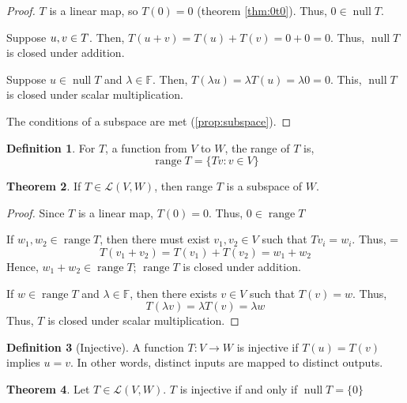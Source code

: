 \documentclass[12pt]{report}
\numberwithin{equation}{section}
\theoremstyle{definition}
\newtheorem{theorem}{Theorem}[section]
\newtheorem{definition}[theorem]{Definition}
\DeclareMathOperator{\nulll}{null}
\DeclareMathOperator{\range}{range}
\begin{document}
\begin{proof}
	$ T $ is a linear map, so $ T(0)=0 $ (theorem \ref{thm:0t0}). Thus, $ 0\in\nulll T $.
	
	Suppose $ u,v\in\null T $. Then, $ T(u+v) = T(u) + T(v) = 0 + 0 = 0 $. Thus, $ \nulll T$ is closed under addition. 
	
	Suppose $ u\in\nulll T $ and $  \lambda \in \mathbb{F}$. Then, $ T(\lambda u)  = \lambda T(u) = \lambda 0 = 0$. This, $ \nulll T $ is closed under scalar multiplication.
	
	The conditions of a subspace are met (\ref{prop:subspace}).
\end{proof}

\begin{definition} For $ T $, a function from $ V $ to $ W $, the range of $ T $ is,
	\begin{equation}
			\range T = \{Tv : v\in V\}
	\end{equation}
\end{definition}

\begin{theorem} If $ T\in\mathcal{L}(V,W) $, then range $ T $ is a subspace of $ W $.
\end{theorem}
\begin{proof}
	Since $ T $ is a linear map, $ T(0) = 0 $. Thus, $ 0\in\range T $
	
	If $ w_1, w_2\in \range T $, then there must exist $ v_1, v_2\in V $ such that $ Tv_i = w_i $. Thus, =
	\begin{equation}
			T(v_1+v_2) = T(v_1) + T(v_2) = w_1 + w_2
	\end{equation}
	Hence, $ w_1 + w_2 \in \range T $; $ \range T $ is closed under addition.
	
	If $ w\in\range T $ and $ \lambda\in \mathbb{F} $, then there exists $ v\in V $ such that $ T(v) = w $. Thus,
	\begin{equation}
			T(\lambda v) = \lambda T(v) = \lambda w
	\end{equation}
	Thus, $ T $ is closed under scalar multiplication.
\end{proof}

\begin{definition}[Injective]
	A function $ T: V\rightarrow W $ is injective if $ T(u) = T(v) $ implies $ u=v $. In other words, distinct inputs are mapped to distinct outputs.
\end{definition}

\begin{theorem}
	Let $ T\in \mathcal{L}(V, W) $. $ T $ is injective if and only if $ \nulll T = \{0\} $
\end{theorem}
\end{document}
